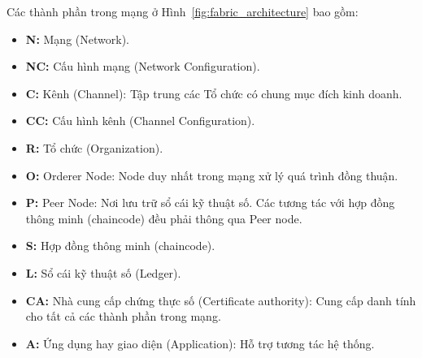 \documentclass[../DoAn.tex]{subfiles}
\begin{document}
Các thành phần trong mạng ở Hình~\ref{fig:fabric_architecture} bao gồm:
\begin{itemize}
  \item \textbf{N:} Mạng (Network).

  \item \textbf{NC:} Cấu hình mạng (Network Configuration).
  
  \item \textbf{C:} Kênh (Channel): Tập trung các Tổ chức có chung mục đích kinh doanh.
  
  \item \textbf{CC:} Cấu hình kênh (Channel Configuration).
  
  \item \textbf{R:} Tổ chức (Organization).
  
  \item \textbf{O:} Orderer Node: Node duy nhất trong mạng xử lý quá trình đồng thuận.
  
  \item \textbf{P:} Peer Node: Nơi lưu trữ sổ cái kỹ thuật số. Các tương tác với hợp đồng thông minh (chaincode) đều phải thông qua Peer node.
  
  \item \textbf{S:} Hợp đồng thông minh (chaincode).
  
  \item \textbf{L:} Sổ cái kỹ thuật số (Ledger).
  
  \item \textbf{CA:} Nhà cung cấp chứng thực số (Certificate authority): Cung cấp danh tính cho tất cả các thành phần trong mạng.
  
  \item \textbf{A:} Ứng dụng hay giao diện (Application): Hỗ trợ tương tác hệ thống.
\end{itemize}
\end{document}
